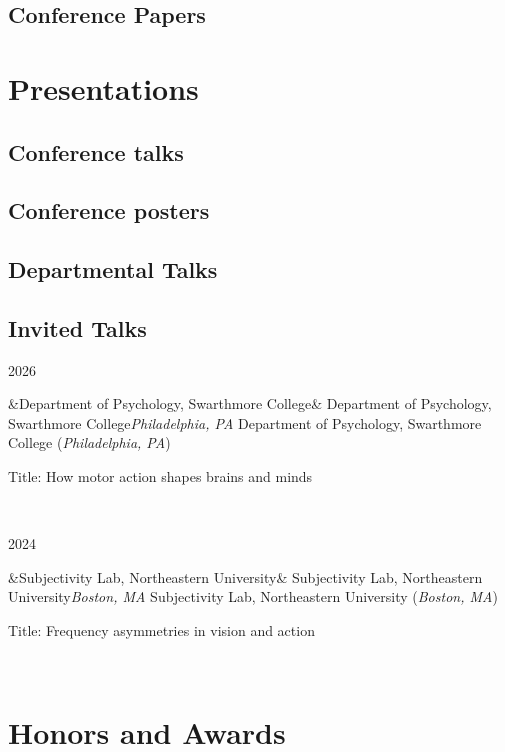 \documentclass{article}
\newcommand{\invitedtalkentry}[4]{
  \begin{minipage}[t]{.15\textwidth}
    \begin{flushright}
      \hfill {#1} %
    \end{flushright}
  \end{minipage}
  \hfill\vline\hfill
  \begin{minipage}[t]{.80\textwidth}

    \ifx&#2&
      {#2}\textit{#3} %
    \else
     {#2 (}\textit{#3}{)}

    \fi
    \footnotesize{#4} %
  \end{minipage}\\\vspace{.25cm}
}
\begin{document}
\subsection{Conference Papers}
\nocite{*}
\printbibliography[heading=none]





\section{Presentations}

\subsection{Conference talks}
\nocite{*}
\printbibliography[heading=none]

\subsection{Conference posters}
\newrefsection[posters]
\nocite{*}
\printbibliography[heading=none]

\subsection{Departmental Talks}
\nocite{*}
\printbibliography[heading=none]

\subsection{Invited Talks}
\invitedtalkentry{2026}{Department of Psychology, Swarthmore College}{Philadelphia, PA}{Title: How motor action shapes brains and minds}

\invitedtalkentry{2024}{Subjectivity Lab, Northeastern University}{Boston, MA}{Title: Frequency asymmetries in vision and action}

\section{Honors and Awards}
\end{document}
